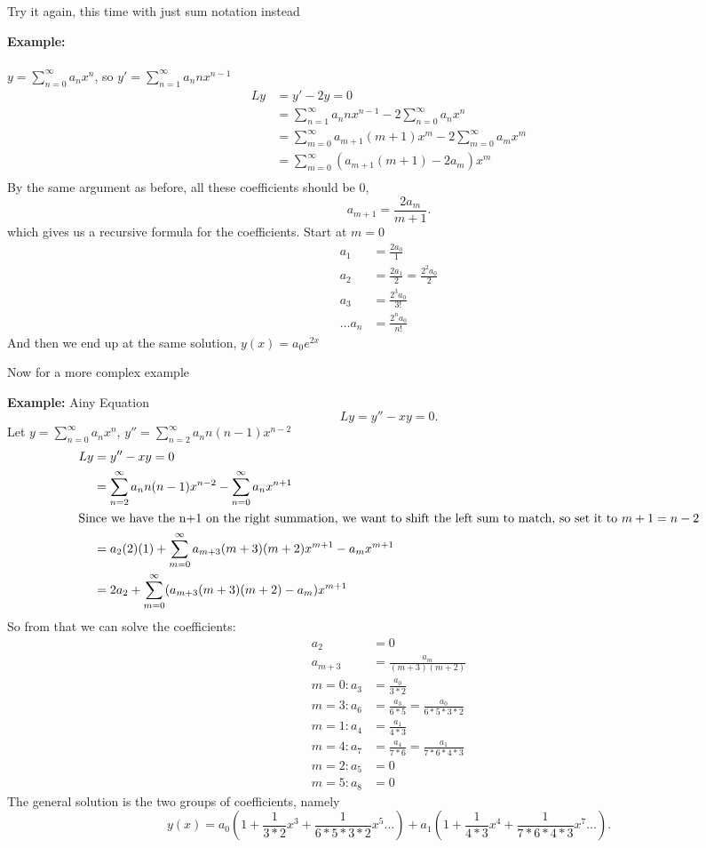 \documentclass{article}
\begin{document}
Try it again, this time with just sum notation instead
\begin{example} 
\textbf{Example:}  \\
~\\
$y = \sum_{n=0}^{\infty} a_n x^n$, so $y' = \sum_{n=1}^{\infty} a_n n x^{n-1}$ \\
\begin{align}
		Ly &= y' - 2y = 0 \\
		   &= \sum_{n=1}^{\infty} a_n n x^{n-1} - 2\sum_{n=0}^{\infty} a_n x^n \\
		   &= \sum_{m=0}^{\infty} a_{m+1} (m+1) x^m - 2\sum_{m=0}^{\infty} a_m x^m \\
		   &=  \sum_{m=0}^{\infty} (a_{m+1} (m+1) - 2a_m) x^m \\ 
\end{align}
By the same argument as before, all these coefficients should be $0$, 
\[
	a_{m+1} = \frac{2a_m}{m+1}
.\] 
which gives us a recursive formula for the coefficients. Start at $m=0$
\begin{align}
	a_1 &= \frac{2a_0}{1} \\
	a_2 &= \frac{2a_1}{2} = \frac{2^2 a_0}{2} \\
	a_3 &= \frac{2^3a_0}{3!} \\
	\ldots
	a_n &= \frac{2^n a_0}{n!}
\end{align}
And then we end up at the same solution, $y(x) = a_0 e^{2x}$
\end{example}
Now for a more complex example
\begin{example} 
\textbf{Example:} Ainy Equation \\
\[
Ly = y'' - xy = 0
.\] 
Let $y =\sum_{n=0}^{\infty} a_n x^n$, $y'' = \sum_{n=2}^{\infty} a_n n(n-1) x^{n-2}$
\begin{align}
	Ly &= y'' -xy = 0 \\
	   &= \sum_{n=2}^{\infty} a_n n(n-1) x^{n-2} - \sum_{n=0}^{\infty} a_n x^{n+1} \\ 
	   \intertext{Since we have the n+1 on the right summation, we want to shift the left sum to match, so set it to $m+1 = n-2$}
	   &= a_2(2)(1) + \sum_{m=0}^{\infty} a_{m+3} (m+3)(m+2)x^{m+1} - a_m x^{m+1} \\
	   &= 2a_2 + \sum_{m=0}^{\infty} ( a_{m+3} (m+3)(m+2) - a_m)x^{m+1}
\end{align}
So from that we can solve the coefficients:
\begin{align}
	a_2 &= 0 \\
	a_{m+3} &= \frac{a_m}{(m+3)(m+2)} \\	
	m = 0: a_3 &= \frac{a_0}{3*2} \\
	m = 3: a_6 &= \frac{a_3}{6*5} = \frac{a_0}{6*5*3*2} \\
	m = 1: a_4 &= \frac{a_1}{4*3} \\
	m = 4: a_7 &= \frac{a_4}{7*6} = \frac{a_1}{7*6*4*3}\\
	m = 2: a_5 &= 0 \\
	m = 5: a_8 &= 0
\end{align}
The general solution is the two groups of coefficients, namely
\[
	y(x) = a_0(1 + \frac{1}{3*2}x^3 + \frac{1}{6*5*3*2}x^5 \ldots) + a_1(1 + \frac{1}{4*3}x^4 + \frac{1}{7*6*4*3}x^7 \ldots) 
.\] 
\end{example}
\end{document}
